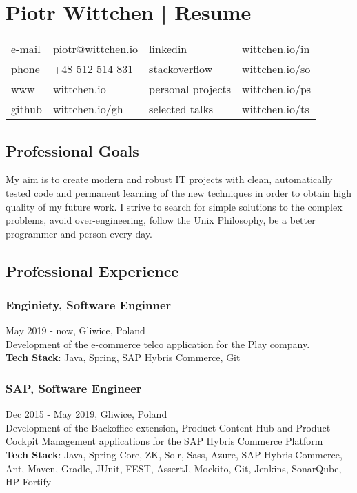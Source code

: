 \documentclass{article}
\begin{document}
  \section*{Piotr Wittchen | Resume}

  \begin{tabular}{llll}\small
    e-mail & piotr@wittchen.io & linkedin          & wittchen.io/in \\
    phone  & +48 512 514 831   & stackoverflow     & wittchen.io/so \\
    www    & wittchen.io       & personal projects & wittchen.io/ps \\
    github & wittchen.io/gh    & selected talks    & wittchen.io/ts \\
  \end{tabular}

    \subsection*{Professional Goals}
    \small{My aim is to create modern and robust IT projects with clean,
    automatically tested code and permanent learning of the new techniques
    in order to obtain high quality of my future work.
    I strive to search for simple solutions to the complex problems,
    avoid over-engineering, follow the Unix Philosophy,
    be a better programmer and person every day.}

    \subsection*{Professional Experience}

      \subsubsection*{Enginiety, Software Enginner}
      May 2019 - now, Gliwice, Poland\\[0.3em] 
      Development of the e-commerce telco application for the Play company.\\
      \textbf{Tech Stack}: Java, Spring, SAP Hybris Commerce, Git

      \subsubsection*{SAP, Software Engineer} 
      Dec 2015 - May 2019, Gliwice, Poland\\[0.3em]
      Development of the Backoffice extension, Product Content Hub 
      and Product Cockpit Management applications for the SAP Hybris Commerce Platform\\
      \textbf{Tech Stack}: Java, Spring Core, ZK, Solr, Sass, Azure, 
      SAP Hybris Commerce, Ant, Maven, Gradle, JUnit, FEST, AssertJ, 
      Mockito, Git, Jenkins, SonarQube, HP Fortify
\end{document}
